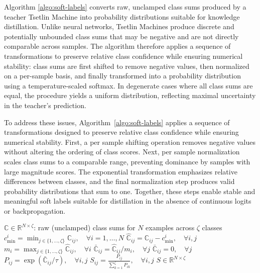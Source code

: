 \documentclass[sn-mathphys-num]{sn-jnl}%
\theoremstyle{thmstyleone}%
\theoremstyle{thmstyletwo}%
\theoremstyle{thmstylethree}%
\begin{document}
Algorithm \ref{algo:soft-labels} converts raw, unclamped class sums produced by a teacher Tsetlin Machine into probability distributions suitable for knowledge distillation. Unlike neural networks, Tsetlin Machines produce discrete and potentially unbounded class sums that may be negative and are not directly comparable across samples. The algorithm therefore applies a sequence of transformations to preserve relative class confidence while ensuring numerical stability: class sums are first shifted to remove negative values, then normalized on a per-sample basis, and finally transformed into a probability distribution using a temperature-scaled softmax. In degenerate cases where all class sums are equal, the procedure yields a uniform distribution, reflecting maximal uncertainty in the teacher’s prediction.

To address these issues, Algorithm~\ref{algo:soft-labels} applies a sequence of transformations designed to preserve relative class confidence while ensuring numerical stability. First, a per sample shifting operation removes negative values without altering the ordering of class scores. Next, per sample normalization scales class sums to a comparable range, preventing dominance by samples with large magnitude scores. The exponential transformation emphasizes relative differences between classes, and the final normalization step produces valid probability distributions that sum to one. Together, these steps enable stable and meaningful soft labels suitable for distillation in the absence of continuous logits or backpropagation.

\begin{algorithm}[h]
	\caption{Generate Soft Labels from Tsetlin Machine Class Sums}
	\label{algo:soft-labels}
	\begin{algorithmic}[1]
		\Require $\mathbb{C} \in \mathbb{R}^{N \times \zeta}$: raw (unclamped) class sums for $N$ examples across $\zeta$ classes
		\State $c_{\min}^i = \min_{j \in \{1,\dots,\zeta\}} \mathbb{C}_{ij}, \quad \forall i = 1,\dots,N$
		\State $\hat{\mathbb{C}}_{ij} = \mathbb{C}_{ij} - c_{\min}^i, \quad \forall i,j$  
		\\
		\State $m_i = \max_{j \in \{1,\dots,\zeta\}} \hat{\mathbb{C}}_{ij}, \quad \forall i$
		\State $\bar{\mathbb{C}}_{ij} = \hat{\mathbb{C}}_{ij} / m_i, \quad \forall j$  
		\Else
		\State $\bar{\mathbb{C}}_{ij} = 0, \quad \forall j$  
		\EndIf
		\\
		\State $P_{ij} = \exp\left(\bar{\mathbb{C}}_{ij} / \tau\right), \quad \forall i,j$  %
		\State $S_{ij} = \displaystyle \frac{P_{ij}}{\sum_{k=1}^{\zeta} P_{ik}}, \quad \forall i,j$
		\State \Return $S \in \mathbb{R}^{N \times \zeta}$
		\EndFunction
	\end{algorithmic}
\end{algorithm}
\end{document}
